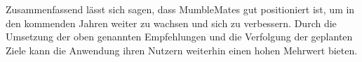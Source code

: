 Zusammenfassend lässt sich sagen, dass MumbleMates gut positioniert ist, um in den kommenden Jahren weiter zu wachsen und sich zu verbessern. Durch die Umsetzung der oben genannten Empfehlungen und die Verfolgung der geplanten Ziele kann die Anwendung ihren Nutzern weiterhin einen hohen Mehrwert bieten.